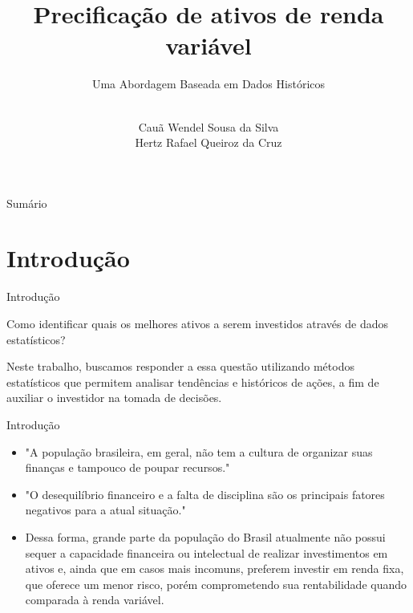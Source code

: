 \documentclass[aspectratio=169]{beamer}
\title{Precificação de ativos de renda variável}
\subtitle{Uma Abordagem Baseada em Dados Históricos}
\author{\\Cauã Wendel Sousa da Silva \\ Hertz Rafael Queiroz da Cruz}
\begin{document}
\begin{frame}
  \maketitle
\end{frame}


\begin{frame}{Sumário}
  \tableofcontents
\end{frame}

\section{Introdução}
\begin{frame}{Introdução}

  \begin{center}
    {\Large Como identificar quais os melhores ativos a serem investidos através de dados estatísticos?}

    
  \end{center}

  \vspace{0.5cm}
Neste trabalho, buscamos responder a essa questão utilizando métodos estatísticos que permitem analisar tendências e históricos de ações, a fim de auxiliar o investidor na tomada de decisões.


  
\end{frame}

\begin{frame}{Introdução}

  \begin{itemize}
    \item "A população brasileira, em geral, não tem a cultura de organizar suas finanças e tampouco de poupar recursos." \cite{Mendes2015}
    \item "O desequilíbrio financeiro e a falta de disciplina são os principais fatores negativos para a atual situação." \cite{Mendes2015}
    \item Dessa forma, grande parte da população do Brasil atualmente não possui sequer a capacidade financeira ou intelectual de realizar investimentos em ativos e, ainda que em casos mais incomuns, preferem investir em renda fixa, que oferece um menor risco, porém comprometendo sua rentabilidade quando comparada à renda variável.
  \end{itemize}

\end{frame}
\end{document}
